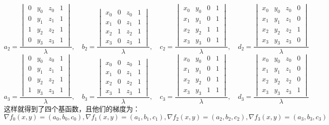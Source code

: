 \documentclass[12pt,a4paper]{article}
\begin{document}
$$
a_2=\frac{\begin{vmatrix}
            0&y_0&z_0&1\\
            0&y_1&z_1&1\\
            1&y_2&z_2&1\\
            0&y_3&z_3&1
          \end{vmatrix}}{\lambda},\quad
b_2=\frac{\begin{vmatrix}
            x_0&0&z_0&1\\
            x_1&0&z_1&1\\
            x_2&1&z_2&1\\
            x_3&0&z_3&1
          \end{vmatrix}}{\lambda},\quad
c_2=\frac{\begin{vmatrix}
            x_0&y_0&0&1\\
            x_1&y_1&0&1\\
            x_2&y_2&1&1\\
            x_3&y_3&0&1
          \end{vmatrix}}{\lambda},\quad
d_2=\frac{\begin{vmatrix}
            x_0&y_0&z_0&0\\
            x_1&y_1&z_1&0\\
            x_2&y_2&z_2&1\\
            x_3&y_3&z_3&0
          \end{vmatrix}}{\lambda}          
$$
$$
a_3=\frac{\begin{vmatrix}
            0&y_0&z_0&1\\
            0&y_1&z_1&1\\
            0&y_2&z_2&1\\
            1&y_3&z_3&1
          \end{vmatrix}}{\lambda},\quad
b_3=\frac{\begin{vmatrix}
            x_0&0&z_0&1\\
            x_1&0&z_1&1\\
            x_2&0&z_2&1\\
            x_3&1&z_3&1
          \end{vmatrix}}{\lambda},\quad
c_3=\frac{\begin{vmatrix}
            x_0&y_0&0&1\\
            x_1&y_1&0&1\\
            x_2&y_2&0&1\\
            x_3&y_3&1&1
          \end{vmatrix}}{\lambda},\quad
d_3=\frac{\begin{vmatrix}
            x_0&y_0&z_0&0\\
            x_1&y_1&z_1&0\\
            x_2&y_2&z_2&0\\
            x_3&y_3&z_3&1
          \end{vmatrix}}{\lambda}          
$$
这样就得到了四个基函数，且他们的梯度为：
$$
\nabla f_0(x,y)=(a_0,b_0,c_0),\nabla f_1(x,y)=(a_1,b_1,c_1),\nabla f_2(x,y)=(a_2,b_2,c_2),\nabla f_3(x,y)=(a_3,b_3,c_3)
$$
\end{document}
